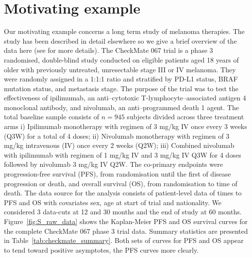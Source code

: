 \documentclass[AMA,STIX1COL]{WileyNJD-v2}
\begin{document}
\section{Motivating example}\label{sec:example}
Our motivating example concerns a long term study of melanoma therapies.
The study has been described in detail elsewhere so we give a brief overview of the data here (see \citep{Wolchok2017, Larkin2019, Hodi2018} for more details).
The CheckMate 067 trial is a phase 3 randomised, double-blind study conducted on eligible patients aged 18 years of older with previously untreated, unresectable stage III or IV melanoma.
They were randomly assigned in a 1:1:1 ratio and stratified by PD-L1 status, BRAF mutation status, and metastasis stage.
The purpose of the trial was to test the effectiveness of ipilimumab, an anti–cytotoxic T-lymphocyte–associated antigen 4 monoclonal antibody, and nivolumab, an anti–programmed death 1 agent.
The total baseline sample consists of $n = 945$ subjects divided across three treatment arms
i) Ipilimumab monotherapy with regimen of 3 mg/kg IV once every 3 weeks (Q3W) for a total of 4 doses;
ii) Nivolumab monotherapy with regimen of 3 mg/kg intravenous (IV) once every 2 weeks (Q2W);
iii) Combined nivolumab with ipilimumab with regimen of 1 mg/kg IV and 3 mg/kg IV Q3W for 4 doses followed by nivolumab 3 mg/kg IV Q2W.
The co-primary endpoints were progression-free survival (PFS), from randomisation until the first of disease progression or death, and overall survival (OS), from randomisation to time of death.
The data source for the analysis consists of patient-level data of times to PFS and OS with covariates sex, age at start of trial and nationality.
We considered 3 data-cuts at 12 and 30 months and the end of study at 60 months.
Figure~\ref{fig:S_raw_data} shows the Kaplan-Meier PFS and OS survival curves for the complete CheckMate 067 phase 3 trial data.
Summary statistics are presented in Table~\ref{tab:checkmate_summary}.
Both sets of curves for PFS and OS appear to tend toward positive asymptotes, the PFS curves more clearly.

\end{document}
